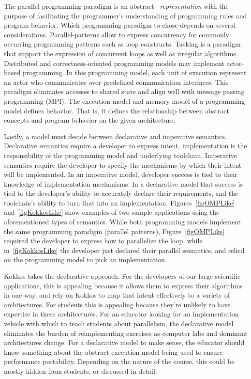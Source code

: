
The parallel programming paradigm is an abstract ~\emph{representation} with the purpose of facilitating the programmer's understanding of programming rules and program behavior. Which programming paradigm to chose depends on several considerations. Parallel-patterns allow to express concurrency for commonly occurring programming patterns such as loop constructs. Tasking is a paradigm that support the expression of concurrent loops as well as irregular algorithms. Distributed and correctness-oriented programming models may implement actor-based programming. In this programming model, each unit of execution represent an actor who communicates over predefined communication interfaces. This paradigm eliminates accesses to shared state and align well with message passing programming (MPI). The execution model and memory model of a programming model defines behavior. That is, it defines the relationship between abstract concepts and program behavior on the given architecture.

Lastly, a model must decide between declarative and imperative semantics. Declarative semantics require a developer to express intent, implementation is the responsibility of the programming model and underlying toolchain. Imperative semantics require the developer to specify the mechanisms by which their intent will be implemented. In an imperative model, developer success is tied to their knowledge of implementation mechanisms. In a declarative model that success is tied to the developer's ability to accurately declare their requirements, and the toolchain's ability to turn that into an implementation. Figures~\ref{figOMPLike} and~\ref{figKokkosLike} show examples of two sample applications using the aforementioned types of semantics. While both programming models implement the same programming paradigm (parallel patterns), Figure~\ref{figOMPLike} required the developer to express how to parallelize the loop, while in~\ref{figKokkosLike} the developer just declared their parallel semantics, and relied on the programming model to pick an implementation. 

Kokkos takes the declarative approach. For the developers of our large scientific applications, this is appealing because it allows them to express their algorithms in one way, and rely on Kokkos to map that intent effectively to a variety of architectures. For students this is appealing because they're unlikely to have expertise in these architectures. For an educator looking for an implementation vehicle with which to teach students about parallelism, the declarative model eliminates the burden of reimplementing exercises as computer labs and dominant architectures change. For a declarative model to make sense, the educator should know something about the abstract execution model being used to ensure performance portability. Depending on the nature of the course, this could be mostly hidden from students, or discussed in detail.

